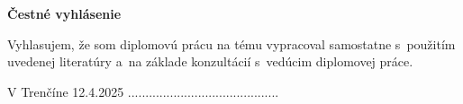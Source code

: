 
\vspace*{\fill}

\noindent \textbf{Čestné vyhlásenie}

\vspace{1em}

Vyhlasujem, že som diplomovú prácu na tému \uv{\nazovprace} vypracoval samostatne s~použitím uvedenej literatúry a~na základe konzultácií s~vedúcim diplomovej práce.

\vspace{2cm}

\noindent V Trenčíne 12.4.2025 \hfill ........................................... \\
\mbox{} \hfill \autor

\clearpage
